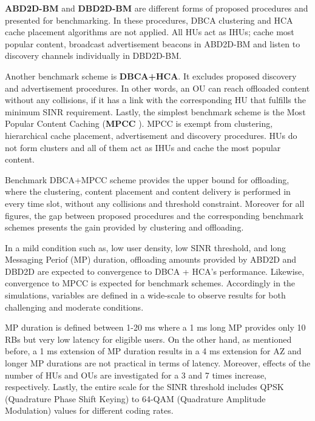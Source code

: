 \documentclass[10pt,a4paper,twocolumn]{article}
\begin{document}
\textbf{ABD2D-BM} and \textbf{DBD2D-BM} are different forms of proposed procedures and presented for benchmarking. In these procedures, DBCA clustering and HCA cache placement  algorithms are not applied. All HUs act as IHUs; cache most popular content, broadcast advertisement beacons in ABD2D-BM and listen to discovery channels individually in DBD2D-BM.

Another benchmark scheme is \textbf{DBCA+HCA}. It excludes proposed discovery and advertisement procedures. In other words, an OU can reach offloaded content without any collisions, if it has a link with the corresponding HU that fulfills the minimum SINR requirement. Lastly, the simplest benchmark scheme is the  Most Popular Content Caching (\textbf{MPCC} ). MPCC is exempt from clustering, hierarchical cache placement, advertisement and discovery procedures. HUs do not form clusters and all of them act as IHUs and cache the most popular content.


Benchmark DBCA+MPCC scheme provides the upper bound for offloading, where the clustering, content placement and content delivery is performed in every time slot, without any collisions and threshold constraint. Moreover for all figures, the gap between proposed procedures and the corresponding benchmark schemes presents the gain provided by clustering and offloading.

In a mild condition such as, low user density, low SINR threshold, and long Messaging Periof (MP) duration, offloading amounts provided by ABD2D and DBD2D are expected to convergence to DBCA + HCA's performance. Likewise, convergence to MPCC is expected for benchmark schemes. Accordingly in the simulations, variables are defined in a wide-scale to observe results for both challenging and moderate conditions.

MP duration is defined between 1-20 ms where a 1 ms long MP provides only 10 RBs but very low latency for eligible users. On the other hand, as mentioned before, a 1 ms extension of MP duration results in a 4 ms extension for AZ and longer MP durations are not practical in terms of latency. Moreover, effects of the number of HUs and OUs are investigated for a 3 and 7 times increase, respectively. Lastly, the entire scale for the SINR threshold includes QPSK (Quadrature Phase Shift Keying) to 64-QAM (Quadrature Amplitude Modulation) values for different coding rates.
\end{document}
